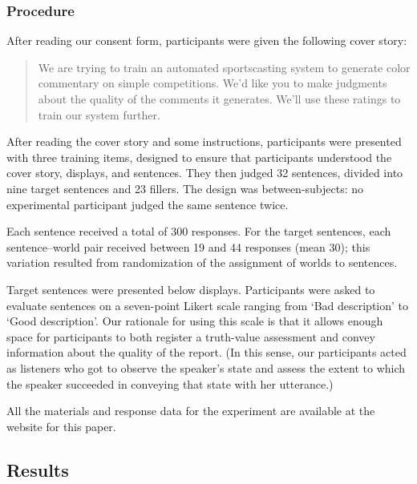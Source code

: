 \documentclass[leqno,12pt]{article}
\begin{document}



\subsubsection{Procedure} 

After reading our consent form, participants were given the following
cover story:

\begin{quote}
  We are trying to train an automated sportscasting system to generate
  color commentary on simple competitions. We'd like you to make
  judgments about the quality of the comments it generates. We'll use
  these ratings to train our system further.
\end{quote}

After reading the cover story and some instructions, participants were
presented with three training items, designed to ensure that participants
understood the cover story, displays, and sentences. They then judged 32
sentences, divided into nine target sentences and 23 fillers. The
design was between-subjects: no experimental participant judged the same sentence twice. 
 
Each sentence received a
total of 300 responses. For the target sentences, each sentence--world
pair received between 19 and 44 responses (mean 30); this variation
resulted from randomization of the assignment of worlds to sentences. 

Target sentences were presented below displays. Participants were
asked to evaluate sentences on a seven-point
Likert scale ranging from `Bad description' to `Good description'. Our
rationale for using this scale is that it allows enough space for
participants to both register a truth-value assessment and convey
information about the quality of the report. (In this sense, our
participants acted as listeners who got to observe the speaker's state
and assess the extent to which the speaker succeeded in conveying that
state with her utterance.)

All the materials and response data for the experiment are available at
the website for this paper.


\subsection{Results}\label{sec:exp1:results}
\end{document}
